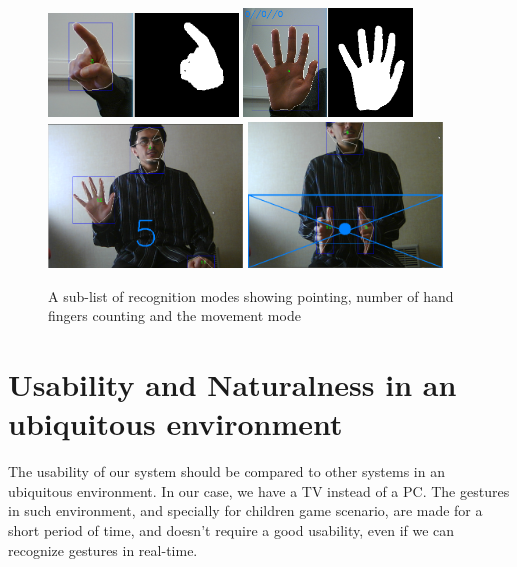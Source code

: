 \documentclass{llncs}
\begin{document}
\begin{figure}[!htb]
\centering
  \includegraphics[width=0.45\textwidth]{./pics/point.png}
  \includegraphics[width=0.4\textwidth]{./pics/simplify.png}
  \includegraphics[width=0.46\textwidth]{./pics/fingers.png}
  \includegraphics[width=0.46\textwidth]{./pics/move.png}
  \caption{A sub-list of recognition modes showing pointing, number of hand
fingers counting and the movement mode}
\end{figure}


\section{Usability and Naturalness in an ubiquitous environment}

The usability of our system should be compared to other systems in an ubiquitous
environment. In our case, we have a TV instead of a PC.
The gestures in such environment, and specially for children game scenario,
are made for a short period of time, and doesn't require a good usability,
even if we can recognize gestures in real-time.
\end{document}
